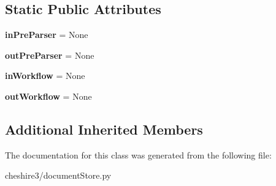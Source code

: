 \subsection*{Static Public Attributes}
\begin{DoxyCompactItemize}
\item 
\hypertarget{classcheshire3_1_1document_store_1_1_simple_document_store_aef72ce9a4b3de6415a663f04cc3392a9}{{\bfseries in\-Pre\-Parser} = None}\label{classcheshire3_1_1document_store_1_1_simple_document_store_aef72ce9a4b3de6415a663f04cc3392a9}

\item 
\hypertarget{classcheshire3_1_1document_store_1_1_simple_document_store_a92ecd47990a85e67607a9ac9f1199da7}{{\bfseries out\-Pre\-Parser} = None}\label{classcheshire3_1_1document_store_1_1_simple_document_store_a92ecd47990a85e67607a9ac9f1199da7}

\item 
\hypertarget{classcheshire3_1_1document_store_1_1_simple_document_store_a6e8bfd3a6dbbb1ad186b7a6e5285c156}{{\bfseries in\-Workflow} = None}\label{classcheshire3_1_1document_store_1_1_simple_document_store_a6e8bfd3a6dbbb1ad186b7a6e5285c156}

\item 
\hypertarget{classcheshire3_1_1document_store_1_1_simple_document_store_a4de032000a9d6f8abbb66725c95b46a7}{{\bfseries out\-Workflow} = None}\label{classcheshire3_1_1document_store_1_1_simple_document_store_a4de032000a9d6f8abbb66725c95b46a7}

\end{DoxyCompactItemize}
\subsection*{Additional Inherited Members}


The documentation for this class was generated from the following file\-:\begin{DoxyCompactItemize}
\item 
cheshire3/document\-Store.\-py\end{DoxyCompactItemize}
